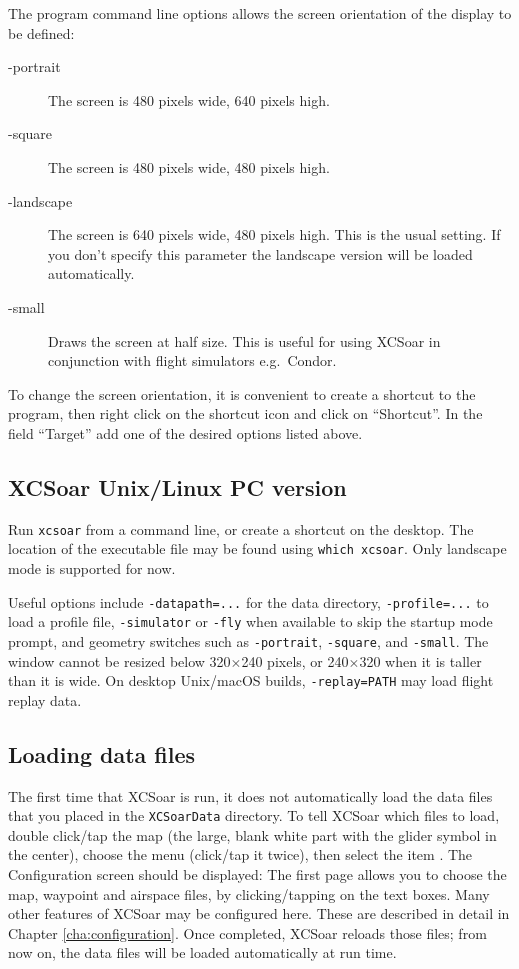 The program command line options allows the screen orientation of
the display to be defined:
\begin{description}
\item[-portrait] The screen is 480 pixels wide, 640 pixels high.
\item[-square] The screen is 480 pixels wide, 480 pixels high.
\item[-landscape] The screen is 640 pixels wide, 480 pixels high. This is the
usual setting. If you don't specify this parameter the landscape version will be
loaded automatically.
\item[-small] Draws the screen at half size.  This is useful for using XCSoar in
 conjunction with flight simulators e.g.\ Condor.
\end{description}
To change the screen orientation, it is convenient to create a shortcut to the
program, then right click on the shortcut icon and click on ``Shortcut''. 
In the field ``Target'' add one of the desired options listed above.

\subsection*{XCSoar Unix/Linux PC version}
Run \verb|xcsoar| from a command line, or create a shortcut on the
desktop.  The location of the executable file may be found using
\verb|which xcsoar|.  Only landscape mode is  supported for now.

Useful options include \verb|-datapath=...| for the data directory,
\verb|-profile=...| to load a profile file, \verb|-simulator| or \verb|-fly|
when available to skip the startup mode prompt, and geometry switches such as
\verb|-portrait|, \verb|-square|, and \verb|-small|.
The window cannot be resized below 320$\times$240 pixels, or
240$\times$320 when it is taller than it is wide.
On desktop Unix/macOS builds, \verb|-replay=PATH| may load flight replay data.

\subsection*{Loading data files}\label{sec:loaddatafiles}
The first time that XCSoar is run, it does not automatically load the 
data files that you placed in the \verb|XCSoarData| directory.  
To tell XCSoar which files to load, double click/tap the map (the large,
blank white part with the glider symbol in the center),
choose the menu  (click/tap it twice), then select the item 
\mbox{.}  The Configuration screen should be displayed:
The first page allows you to choose the map, 
waypoint and airspace files, by clicking/tapping on the text boxes.
Many other features of XCSoar may be configured here. These are described in detail in Chapter
\ref{cha:configuration}.
Once completed, XCSoar reloads those files; from now on, the data files
will be loaded automatically at run time.

